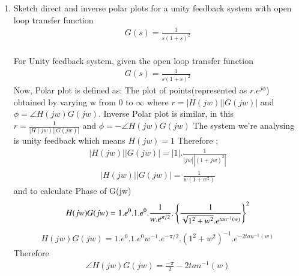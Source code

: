 \begin{enumerate}[label=\thesection.\arabic*.,ref=\thesection.\theenumi]
\item
Sketch direct and inverse polar plots for a unity feedback system with open loop transfer function
\begin{align}
G(s) = \frac{1}{s(1+s)^2}
\end{align}
\\
\solution  
For Unity feedback system, given the open loop transfer function
\begin{align}
G(s) = \frac{1}{s(1+s)^2}
\end{align}
Now, Polar plot is defined as:
The plot of points(represented as $r.e^{j\phi}$) obtained by varying w from 0 to $\infty$  where $r=|H(jw)||G(jw)|$ and $\phi=\angle H(jw)G(jw)$.
\linebreak
Inverse Polar plot is similar, in this $r = \frac{1}{|H(jw)||G(jw)|}$ and $\phi = -\angle H(jw)G(jw)$   
The system we're analysing is unity feedback which means $H(jw) = 1$
Therefore ;
\begin{align}
|H(jw)||G(jw)| = |1|.\frac{1}{|jw||(1+jw)^2|}  
\end{align}
\begin{align}
|H(jw)||G(jw)| = \frac{1}{w(1+w^2)}
\label{eq:mod_G}
\end{align}
and to calculate Phase of G(jw)
\begin{align}
H(jw)G(jw) = 1.e^{0}.1.e^{0}.\frac{1}{w.e^{\pi/2}} . \left\{\frac{1}{\sqrt{1^2 + w^2} . e^{tan^{-1}(w)}}\right\}^2  
\end{align}
\begin{align}
H(jw)G(jw) = 1.e^{0}.1.e^{0} w^{-1}.e^{-\pi/2}. (1^2 + w^2)^{-1} . e^{-2tan^{-1}(w)}  
\end{align}
Therefore
\begin{align}
\angle H(jw)G(jw) = \frac{-\pi}{2} - 2tan^{-1}(w)  
\label{eq:phase_G}
\end{align}


\end{enumerate}
